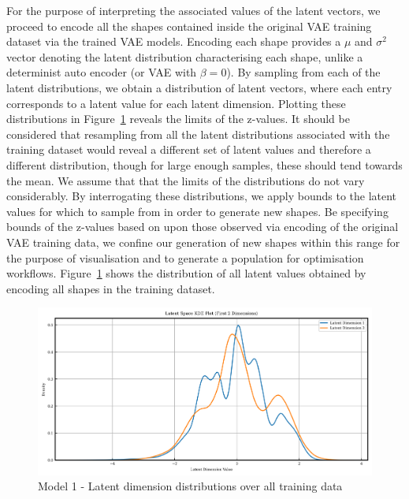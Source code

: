 \documentclass{article}
\begin{document}
For the purpose of interpreting the associated values of the latent vectors, we proceed to encode all the shapes contained inside the original VAE training dataset via the trained VAE models. Encoding each shape provides a $\mu$ and $\sigma^2$ vector denoting the latent distribution characterising each shape, unlike a determinist auto encoder (or VAE with $\beta=0$). By sampling from each of the latent distributions, we obtain a distribution of latent vectors, where each entry corresponds to a latent value for each latent dimension.  Plotting these distributions in Figure~\ref{fig:model1_latent_dist} reveals the limits of the z-values. It should be considered that  resampling from all the latent distributions associated with the training dataset would reveal a different set of latent values and therefore a different distribution, though for large enough samples, these should tend towards the mean. We assume that that the limits of the distributions do not vary considerably. By interrogating these distributions, we apply bounds to the latent values for which to sample from in order to generate new shapes. Be specifying bounds of the z-values based on upon those observed via encoding of the original VAE training data, we confine our generation of new shapes within this range for the purpose of visualisation and to generate a population for optimisation workflows. Figure~\ref{fig:model1_latent_dist} shows the distribution of all latent values obtained by encoding all shapes in the training dataset.
\begin{figure}[H]
    \centering
    \includegraphics[width=0.75\linewidth]{figures/VAEmodels/model1/latent_distribution.png}
    \caption{Model 1 - Latent dimension distributions over all training data}
    \label{fig:model1_latent_dist}
\end{figure}
\end{document}
